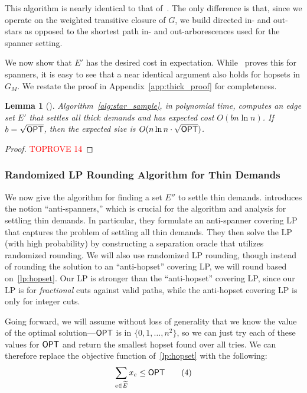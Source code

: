 \documentclass{article}
\newtheorem{lemma}[theorem]{Lemma}
\theoremstyle{definition}
\theoremstyle{remark}
\def\opt {{\sf OPT}}
\begin{document}
This algorithm is nearly identical to that of~\cite{DK11}. The only difference is that, since we operate on the weighted transitive closure of $G$, we build directed in- and out-stars as opposed to the shortest path in- and out-arborescences used for the spanner setting. 

We now show that $E'$ has the desired cost in expectation. While~\cite{DK11} proves this for spanners, it is easy to see that a near identical argument also holds for hopsets in $G_M$. We restate the proof \iflong \else in Appendix~\ref{app:thick_proof} \fi for completeness.

\begin{lemma}[\hspace{1sp}\cite{DK11}] \label{lem:thick}
    Algorithm~\ref{alg:star_sample}, in polynomial time, computes an edge set $E'$ that settles all thick demands and has expected cost $O(bn\ln{n} )$. If $b = \sqrt{{\opt}}$, then the expected size is $O(n\ln{n} \cdot \sqrt{{\opt}})$.
\end{lemma}
\iflong
\begin{proof}\textcolor{red}{TOPROVE 14}\end{proof}
\else
\fi


\subsubsection{Randomized LP Rounding Algorithm for Thin Demands} 
We now give the algorithm for finding a set $E''$ to settle thin demands. \cite{BBMRY11} introduces the notion ``anti-spanners,'' which is crucial for the algorithm and analysis for settling thin demands. In particular, they formulate an anti-spanner covering LP that captures the problem of settling all thin demands. They then solve the LP (with high probability) by constructing a separation oracle that utilizes randomized rounding. We will also use randomized LP rounding, though instead of rounding the solution to an ``anti-hopset'' covering LP, we will round based on~\ref{lp:hopset}.  Our LP is stronger than the ``anti-hopset'' covering LP, since our LP is for \textit{fractional} cuts against valid paths, while the anti-hopset covering LP is only for integer cuts.

Going forward, we will assume without loss of generality that we know the value of the optimal solution---${\opt}$ is in $\{0, 1, \dots, n^2 \}$, so we can just try each of these values for ${\opt}$ and return the smallest hopset found over all tries. We can therefore replace the objective function of~\ref{lp:hopset} with the following:
\begin{align*}
    \sum_{e \in \widetilde{E}} x_e \leq {\opt} \tag{4}
\end{align*}
\end{document}
